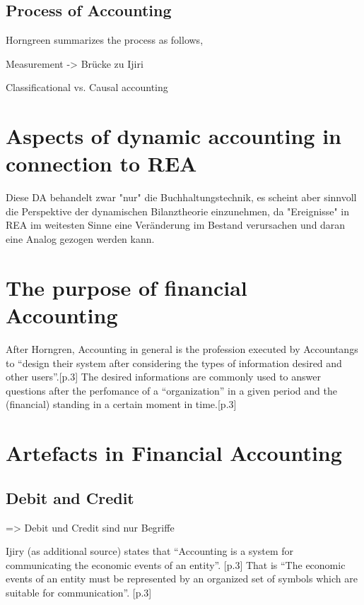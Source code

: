 \subsection{Process of Accounting}
Horngreen summarizes the process as follows, 

Measurement -> Brücke zu Ijiri

Classificational vs. Causal accounting


\section{Aspects of dynamic accounting in connection to REA}

Diese DA behandelt zwar "nur" die Buchhaltungstechnik, es scheint aber sinnvoll die Perspektive der dynamischen Bilanztheorie einzunehmen,
da "Ereignisse" in REA im weitesten Sinne eine Veränderung im Bestand verursachen und daran eine Analog gezogen werden kann.








\section{The purpose of financial Accounting}
After Horngren, Accounting in general is the profession executed by Accountangs to \enquote{design their system after considering the types of information desired and other users}.\cite{Horngren1984}[p.3]
The desired informations are commonly used to answer questions after the perfomance of a \enquote{organization} in a given period and the (financial) standing in a certain moment in time.\cite{Horngren1984}[p.3]

\section{Artefacts in Financial Accounting}

\subsection{Debit and Credit}
=> Debit und Credit sind nur Begriffe 

Ijiry (as additional source) states that \enquote{Accounting is a system for communicating the economic events of an entity}. \cite{Ijiri1967}[p.3]
That is \enquote{The economic events of an entity must be represented by an organized set of symbols which are suitable for communication}. \cite{Ijiri1967}[p.3]

